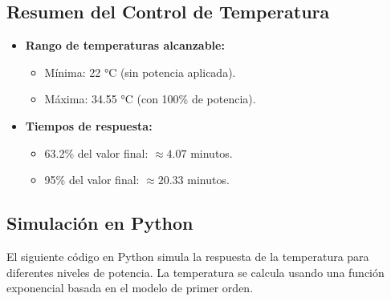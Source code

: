 \documentclass[spanish, a4paper, 11pt]{article}
\begin{document}
\subsection{Resumen del Control de Temperatura}

\begin{itemize}
    \item \textbf{Rango de temperaturas alcanzable:}
    \begin{itemize}
        \item Mínima: 22 °C (sin potencia aplicada).
        \item Máxima: 34.55 °C (con 100\% de potencia).
    \end{itemize}
    \item \textbf{Tiempos de respuesta:}
    \begin{itemize}
        \item 63.2\% del valor final: $\approx 4.07$ minutos.
        \item 95\% del valor final: $\approx 20.33$ minutos.
    \end{itemize}
\end{itemize}

\subsection{Simulación en Python}

El siguiente código en Python simula la respuesta de la temperatura para diferentes niveles de potencia. La temperatura se calcula usando una función exponencial basada en el modelo de primer orden.
\end{document}
